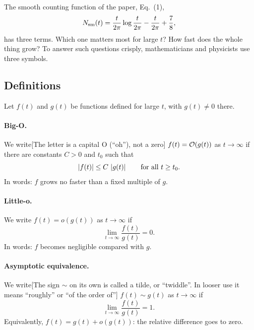 The smooth counting function of the paper, Eq.~(1),
\begin{equation}
N_{\mathrm{sm}}(t)=\frac{t}{2\pi}\log\frac{t}{2\pi}-\frac{t}{2\pi}+\frac78,
\label{eq:asymptotics-nsm}
\end{equation}
has three terms. Which one matters most for large $t$? How fast does the whole thing grow? To answer such questions crisply, mathematicians and physicists use three symbols.

\subsection{Definitions}

Let $f(t)$ and $g(t)$ be functions defined for large $t$, with $g(t)\neq0$ there.

\paragraph{Big-O.} We write[The letter is a capital O (``oh''), not a zero] $f(t)=\mathcal{O}(g(t))$ as $t\to\infty$ if there are constants $C>0$ and $t_0$ such that
\begin{equation}
\left\lvert f(t)\right\rvert\le C\,\left\lvert g(t)\right\rvert\qquad\text{for all } t\ge t_0.
\label{eq:asymptotics-bigO}
\end{equation}
In words: $f$ grows no faster than a fixed multiple of $g$.

\paragraph{Little-o.} We write $f(t)=o(g(t))$ as $t\to\infty$ if
\begin{equation}
\lim_{t\to\infty}\frac{f(t)}{g(t)}=0.
\label{eq:asymptotics-littleo}
\end{equation}
In words: $f$ becomes negligible compared with $g$.

\paragraph{Asymptotic equivalence.} We write[The sign $\sim$ on its own is called a tilde, or ``twiddle''. In looser use it means ``roughly'' or ``of the order of''] $f(t)\sim g(t)$ as $t\to\infty$ if
\begin{equation}
\lim_{t\to\infty}\frac{f(t)}{g(t)}=1.
\label{eq:asymptotics-sim}
\end{equation}
Equivalently, $f(t)=g(t)+o(g(t))$: the relative difference goes to zero.

